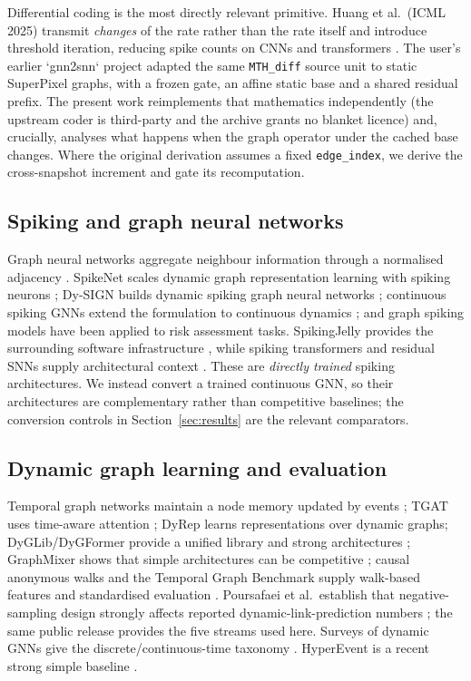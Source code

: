 \documentclass[preprint,12pt]{elsarticle}
\begin{document}
Differential coding is the most directly relevant primitive. Huang et al.\ (ICML 2025) transmit \emph{changes} of the rate rather than the rate itself and introduce threshold iteration, reducing spike counts on CNNs and transformers \cite{huang2025dcgs}. The user's earlier `gnn2snn` project adapted the same \texttt{MTH\_diff} source unit to static SuperPixel graphs, with a frozen gate, an affine static base and a shared residual prefix. The present work reimplements that mathematics independently (the upstream coder is third-party and the archive grants no blanket licence) and, crucially, analyses what happens when the graph operator under the cached base changes. Where the original derivation assumes a fixed \texttt{edge\_index}, we derive the cross-snapshot increment and gate its recomputation.

\subsection{Spiking and graph neural networks}

Graph neural networks aggregate neighbour information through a normalised adjacency \cite{kipf2017gcn,hamilton2017graphsage,velickovic2018gat}. SpikeNet scales dynamic graph representation learning with spiking neurons \cite{li2023spikenet}; Dy-SIGN builds dynamic spiking graph neural networks \cite{yin2024dysign}; continuous spiking GNNs extend the formulation to continuous dynamics \cite{li2024continuousgnn}; and graph spiking models have been applied to risk assessment tasks. SpikingJelly provides the surrounding software infrastructure \cite{fang2023spikingjelly}, while spiking transformers and residual SNNs supply architectural context \cite{zhou2023spikformer,che2023autospikformer,yao2023spikedriven,fang2021sew}. These are \emph{directly trained} spiking architectures. We instead convert a trained continuous GNN, so their architectures are complementary rather than competitive baselines; the conversion controls in Section~\ref{sec:results} are the relevant comparators.

\subsection{Dynamic graph learning and evaluation}

Temporal graph networks maintain a node memory updated by events \cite{rossi2020tgn}; TGAT uses time-aware attention \cite{xu2020tgat}; DyRep learns representations over dynamic graphs; DyGLib/DyGFormer provide a unified library and strong architectures \cite{yu2023dyglib}; GraphMixer shows that simple architectures can be competitive \cite{cong2023graphmixer}; causal anonymous walks and the Temporal Graph Benchmark supply walk-based features and standardised evaluation \cite{huang2023tgb,gao2025hyperevent}. Poursafaei et al.\ establish that negative-sampling design strongly affects reported dynamic-link-prediction numbers \cite{poursafaei2022}; the same public release \cite{poursafaei2022dataset} provides the five streams used here. Surveys of dynamic GNNs give the discrete/continuous-time taxonomy \cite{zheng2025survey}. HyperEvent is a recent strong simple baseline \cite{gao2025hyperevent}.
\end{document}
